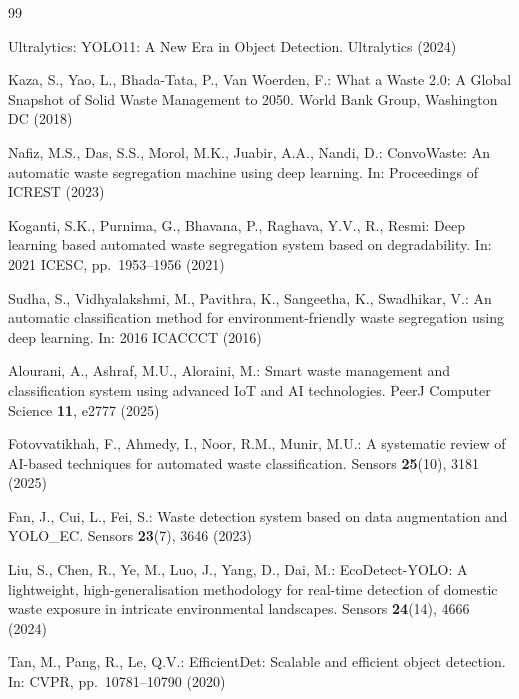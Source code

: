 \documentclass[runningheads]{llncs}
\begin{document}


\begin{thebibliography}{99}

Ultralytics:
{YOLO11}: A New Era in Object Detection.
Ultralytics (2024)

Kaza, S., Yao, L., Bhada-Tata, P., Van Woerden, F.:
What a Waste 2.0: A Global Snapshot of Solid Waste Management to 2050.
World Bank Group, Washington DC (2018)

Nafiz, M.S., Das, S.S., Morol, M.K., Juabir, A.A., Nandi, D.:
ConvoWaste: An automatic waste segregation machine using deep learning.
In: Proceedings of ICREST (2023)

Koganti, S.K., Purnima, G., Bhavana, P., Raghava, Y.V., R., Resmi:
Deep learning based automated waste segregation system based on
degradability.
In: 2021 ICESC, pp.~1953--1956 (2021)

Sudha, S., Vidhyalakshmi, M., Pavithra, K., Sangeetha, K., Swadhikar, V.:
An automatic classification method for environment-friendly waste
segregation using deep learning.
In: 2016 ICACCCT (2016)

Alourani, A., Ashraf, M.U., Aloraini, M.:
Smart waste management and classification system using advanced
{IoT} and {AI} technologies.
PeerJ Computer Science \textbf{11}, e2777 (2025)

Fotovvatikhah, F., Ahmedy, I., Noor, R.M., Munir, M.U.:
A systematic review of {AI}-based techniques for automated
waste classification.
Sensors \textbf{25}(10), 3181 (2025)

Fan, J., Cui, L., Fei, S.:
Waste detection system based on data augmentation and {YOLO\_EC}.
Sensors \textbf{23}(7), 3646 (2023)

Liu, S., Chen, R., Ye, M., Luo, J., Yang, D., Dai, M.:
{EcoDetect-YOLO}: A lightweight, high-generalisation methodology for
real-time detection of domestic waste exposure in intricate
environmental landscapes.
Sensors \textbf{24}(14), 4666 (2024)

Tan, M., Pang, R., Le, Q.V.:
EfficientDet: Scalable and efficient object detection.
In: CVPR, pp.~10781--10790 (2020)


\end{thebibliography}
\end{document}
